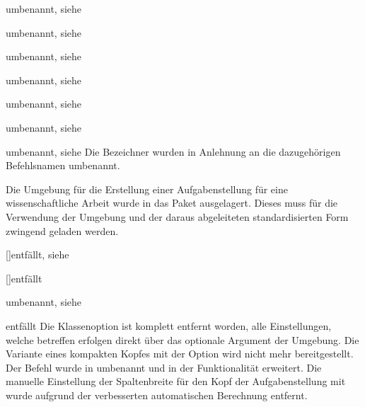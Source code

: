 \begin{Declaration}{}{umbenannt, siehe }
\begin{Declaration}{}{%
  umbenannt, siehe %
}
\begin{Declaration}{}{%
  umbenannt, siehe %
}
\begin{Declaration}{}{%
  umbenannt, siehe %
}
\begin{Declaration}{}{%
  umbenannt, siehe %
}
\begin{Declaration}{}{%
  umbenannt, siehe %
}
\begin{Declaration}{}{%
  umbenannt, siehe %
}
\printdeclarationlist*%
%
Die Bezeichner wurden in Anlehnung an die dazugehörigen Befehlsnamen umbenannt.
\end{Declaration}
\end{Declaration}
\end{Declaration}
\end{Declaration}
\end{Declaration}
\end{Declaration}
\end{Declaration}


Die Umgebung für die Erstellung einer Aufgabenstellung für eine 
wissenschaftliche Arbeit wurde in das Paket  
ausgelagert. Dieses muss für die Verwendung der Umgebung  
und der daraus abgeleiteten standardisierten Form zwingend geladen werden.

\begin{Declaration}{[\PSet]}{entfällt, siehe }
\begin{Declaration}{[\PBoolean]}{entfällt}
\begin{Declaration}{}{%
  umbenannt, siehe %
}
\begin{Declaration}{}{entfällt}
\printdeclarationlist*%
%
Die Klassenoption  ist komplett entfernt worden, alle 
Einstellungen, welche  betreffen erfolgen direkt über das 
optionale Argument der Umgebung. Die Variante eines kompakten Kopfes mit der 
Option  wird nicht mehr bereitgestellt. Der Befehl 
 wurde in  umbenannt und in der Funktionalität 
erweitert. Die manuelle Einstellung der Spaltenbreite für den Kopf der 
Aufgabenstellung mit  wurde aufgrund der verbesserten 
automatischen Berechnung entfernt.
\end{Declaration}
\end{Declaration}
\end{Declaration}
\end{Declaration}

